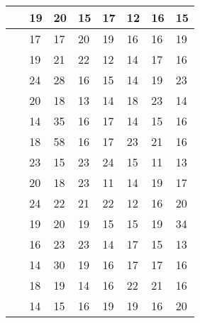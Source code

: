 \documentclass[12pt]{article} %
\begin{document}
\begin{sidewaystable}
\begin{tabular}{|l|l|l|l|l|l|l|l|}
    ~        & 19          & 20                         & 15          & 17          & 12          & 16          & 15          \\ \hline
    ~        & 17          & 17                         & 20          & 19          & 16          & 16          & 19          \\ \hline
    ~        & 19          & 21                         & 22          & 12          & 14          & 17          & 16          \\ \hline
    ~        & 24          & 28                         & 16          & 15          & 14          & 19          & 23          \\ \hline
    ~        & 20          & 18                         & 13          & 14          & 18          & 23          & 14          \\ \hline
    ~        & 14          & 35                         & 16          & 17          & 14          & 15          & 16          \\ \hline
    ~        & 18          & 58                         & 16          & 17          & 23          & 21          & 16          \\ \hline
    ~        & 23          & 15                         & 23          & 24          & 15          & 11          & 13          \\ \hline
    ~        & 20          & 18                         & 23          & 11          & 14          & 19          & 17          \\ \hline
    ~        & 24          & 22                         & 21          & 22          & 12          & 16          & 20          \\ \hline
    ~        & 19          & 20                         & 19          & 15          & 15          & 19          & 34          \\ \hline
    ~        & 16          & 23                         & 23          & 14          & 17          & 15          & 13          \\ \hline
    ~        & 14          & 30                         & 19          & 16          & 17          & 17          & 16          \\ \hline
    ~        & 18          & 19                         & 14          & 16          & 22          & 21          & 16          \\ \hline
    ~        & 14          & 15                         & 16          & 19          & 19          & 16          & 20          \\ \hline

\end{tabular}
\end{sidewaystable}
\end{document}
